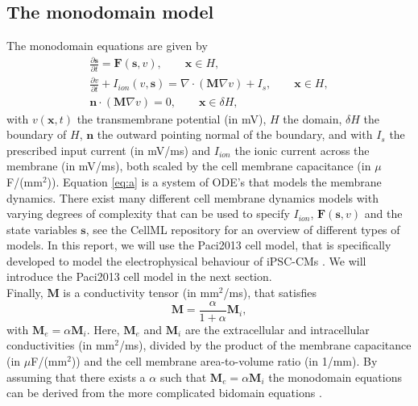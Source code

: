 \documentclass[12pt,a4paper]{article}
\begin{document}
\subsection{The monodomain model} \label{The monodomain model}
The monodomain equations are given by 
\begin{eqnarray} \label{eq:a}
\frac{\partial \mathbf{s}}{\partial t}= \mathbf{F}(\mathbf{s},v), \qquad \mathbf{x} \in H, \\
\frac{\partial v}{\partial t} + I_{ion}(v,\mathbf{s}) =\nabla \label{eq:b} \cdot(\mathbf{M}\nabla v) + I_s,\qquad \mathbf{x} \in H, \\ \label{eq:c}
\mathbf{n}\cdot (\mathbf{M}\nabla v)=0, \qquad \mathbf{x} \in \delta H,
\end{eqnarray}
with $v(\mathbf{x},t)$ the transmembrane potential (in mV), $H$ the domain, $\delta H$ the boundary of $H$, $\mathbf{n}$ the outward pointing normal of the boundary, and with $I_s$ the prescribed input current (in mV/ms) and $I_{ion}$ the ionic current across the membrane (in mV/ms), both scaled by the cell membrane capacitance (in $\mu$F/(mm$^2$)). 
Equation \eqref{eq:a} is a system of ODE's that models the membrane dynamics. There exist many different cell membrane dynamics models with varying degrees of complexity that can be used to specify $I_{ion}$, $\mathbf{F}(\mathbf{s},v)$ and the state variables $\mathbf{s}$, see the CellML repository \cite{cellml} for an overview of different types of models. In this report, we will use the Paci2013 cell model, that is specifically developed to model the electrophysical behaviour of iPSC-CMs \cite{Paci2013}. We will introduce the Paci2013 cell model in the next section.\\ Finally, $\mathbf{M}$ is a conductivity tensor (in mm$^2$/ms), that satisfies 
\begin{equation}
\mathbf{M}=\frac{\alpha}{1+\alpha}\mathbf{M}_i,\label{eq:d}
\end{equation}
with $\mathbf{M}_e=\alpha \mathbf{M}_i$. Here, $\mathbf{M}_e$ and $\mathbf{M}_i$ are the extracellular and intracellular conductivities (in mm$^2$/ms), divided by the product of the membrane capacitance (in $\mu$F/(mm$^2$)) and the cell membrane area-to-volume ratio (in 1/mm). By assuming that there exists a $\alpha$ such that $\mathbf{M}_e=\alpha \mathbf{M}_i$ the monodomain equations can be derived from the more complicated bidomain equations \cite[p. 566-568]{KeenerII}.
%
\end{document}
